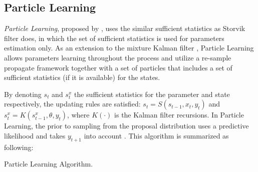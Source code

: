 \subsection{Particle Learning}

\textit{Particle Learning}, proposed by \cite{carvalho2010particle}, uses the similar sufficient statistics as Storvik filter does, in which the set of sufficient statistics is used for parameters estimation only. As an extension to the mixture Kalman filter \cite{chen2000mixture}, Particle Learning allows parameters learning throughout the process and utilize a re-sample propagate framework together with a set of particles that includes a set of sufficient statistics (if it is available) for the states. 

By denoting $s_t$ and $s_t^x$ the sufficient statistics for the parameter and state respectively, the updating rules are satisfied: $s_t=S(s_{t-1},x_t,y_t)$ and $s_t^x=K(s_{t-1}^x,\theta,y_t)$, where $K(\cdot)$ is the Kalman filter recursions. In Particle Learning, the prior to sampling from the proposal distribution uses a predictive likelihood and takes $y_{t+1}$ into account \cite{vieira2016online}. This algorithm is summarized as following: 

\begin{algorithm}[h]
\SetAlgoLined 
\caption{Particle Learning Algorithm.}\label{algorithmPL}
\end{algorithm}

